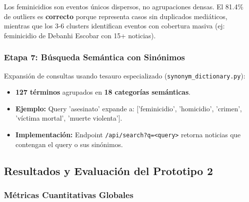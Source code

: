 \textbf{} Los feminicidios son eventos únicos dispersos, no agrupaciones densas. El 81.4\% de outliers es \textbf{correcto} porque representa casos sin duplicados mediáticos, mientras que los 3-6 clusters identifican eventos con cobertura masiva (ej: feminicidio de Debanhi Escobar con 15+ noticias).

\subsubsection{Etapa 7: Búsqueda Semántica con Sinónimos}

Expansión de consultas usando tesauro especializado (\texttt{synonym\_dictionary.py}):

\begin{itemize}
    \item \textbf{127 términos} agrupados en \textbf{18 categorías semánticas}.
    \item \textbf{Ejemplo:} Query 'asesinato' expande a: ['feminicidio', 'homicidio', 'crimen', 'víctima mortal', 'muerte violenta'].
    \item \textbf{Implementación:} Endpoint \texttt{/api/search?q=<query>} retorna noticias que contengan el query o sus sinónimos.
\end{itemize}

\subsection{Resultados y Evaluación del Prototipo 2}
\label{subsec:p2_resultados}

\subsubsection{Métricas Cuantitativas Globales}

